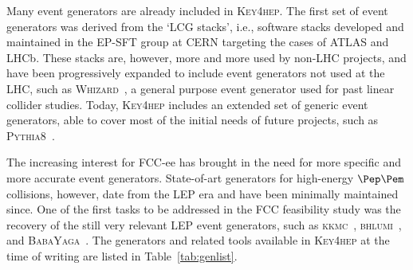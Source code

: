 Many event generators are already included in \textsc{Key4hep}. 
The first set of event generators was derived from the `LCG stacks', 
i.e., software stacks developed and maintained in the EP-SFT group at CERN targeting the cases of ATLAS and LHCb.
These stacks are, however, more and more used by non-LHC projects, 
and have been progressively expanded to include event generators not used at the LHC, 
such as \textsc{Whizard}~\cite{whizard}, a general purpose event generator used for past linear collider studies. 
Today, \textsc{Key4hep} includes an extended set of generic event generators, 
able to cover most of the initial needs of future projects, 
such as \textsc{Pythia8}~\cite{pythia8}. 

The increasing interest for FCC-ee has brought in the need for more specific and more accurate event generators. 
State-of-art generators for high-energy $\epem$ collisions, however, date from the LEP era and have been minimally maintained since. 
One of the first tasks to be addressed in the FCC feasibility study was the recovery of the 
still very relevant LEP event generators, 
such as \textsc{kkmc}~\cite{Jadach:2022mbe}, \textsc{bhlumi}~\cite{bhlumi}, and \textsc{BabaYaga}~\cite{babayaga}. 
The generators and related tools available in \textsc{Key4hep} at the time of writing are listed in Table~\ref{tab:genlist}.

